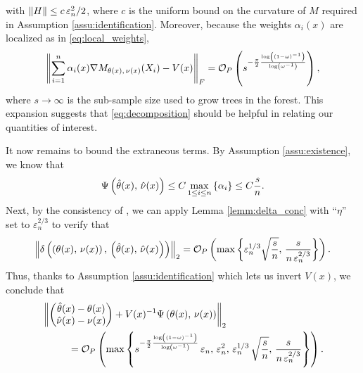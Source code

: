 \documentclass[aos]{imsart}
\theoremstyle{plain}
\theoremstyle{definition}
\theoremstyle{remark}
\begin{document}
\begin{CJK}{UTF8}{gbsn}
{\begin{appendix}
with $\left\lVert H\right\rVert \leq c\,\varepsilon_n^2/2$, where $c$ is the uniform bound on the curvature
of $M$ required in Assumption \ref{assu:identification}.
Moreover, because the weights $\alpha_i(x)$ are localized as in \eqref{eq:local_weights},
\begin{equation}
\label{eq:first_bound}
\Norm{\sum_{i = 1}^n \alpha_i(x) \nabla M_{\theta(x), \, \nu(x)}(X_i) - V(x)}_F = \oo_P\p{s^{-\frac{\pi}{2}\frac{\log\p{\p{1 - \omega}^{-1}}}{\log\p{\omega^{-1}}}}},
\end{equation}
where $s \rightarrow \infty$ is the sub-sample size used to grow trees in the forest.
This expansion suggests that \eqref{eq:decomposition} should be helpful in relating
our quantities of interest.

It now remains to bound the extraneous terms.
By Assumption \ref{assu:existence}, we know that
$$ \Psi\left(\hat{\theta}(x), \, \hat{\nu}(x)\right) \leq C \max_{1 \leq i \leq n} \left\{\alpha_i\right\} \leq C \frac{s}{n}. $$
Next, by the consistency of ,
we can apply Lemma \ref{lemm:delta_conc} with ``$\eta$''
set to $\varepsilon_n^{2/3}$ to verify that
$$\left\lVert\delta\left(\left(\theta(x), \, \nu(x)\right) , \, \left(\hat{\theta}(x), \, \hat{\nu}(x)\right)\right)\right\rVert_2 =
\mathcal{O}_P\left(\max\left\{\varepsilon_n^{1/3} \sqrt{\frac{s}{n}}, \, \frac{s}{n \, \varepsilon_n^{2/3}}\right\}\right). $$
Thus, thanks to Assumption \ref{assu:identification} which lets us invert $V(x)$,
we conclude that 
\begin{equation}
\label{eq:exact_coupling}
\begin{split}
&\Norm{\begin{pmatrix}
\htheta(x) - \theta(x) \\ \hnu(x) - \nu(x)
\end{pmatrix}
+ V(x)^{-1} \Psi\p{\theta(x), \, \nu(x)}}_2 \\
&\ \ \ \ \ \ \ \ = \oo_P\p{\max\cb{s^{-\frac{\pi}{2}\frac{\log\p{\p{1 - \omega}^{-1}}}{\log\p{\omega^{-1}}}} \, \varepsilon_n, \, \varepsilon_n^2, \,  \varepsilon_n^{1/3} \, \sqrt{\frac{s}{n}}, \, \frac{s}{n \, \varepsilon_n^{2/3}}}}. 
\end{split}
\end{equation}



\end{appendix}}
\end{CJK}
\end{document}
